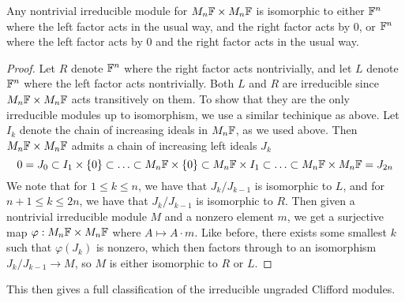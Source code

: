 %
\begin{thm}
Any nontrivial irreducible module for $M_n\mathbb{F} \times M_n\mathbb{F}$ is isomorphic to
either $\mathbb{F}^n$ where the left factor acts in the usual way, and the right factor
acts by $0$, or $\mathbb{F}^n$ where the left factor acts by $0$ and the right factor
acts in the usual way.
\end{thm}
%
\begin{proof}
Let $R$ denote $\mathbb{F}^n$ where the right factor acts nontrivially, and let $L$
denote $\mathbb{F}^n$ where the left factor acts nontrivially. Both $L$ and $R$ are
irreducible since $M_n\mathbb{F} \times M_n\mathbb{F}$ acts transitively on them. To show
that they are the only irreducible modules up to isomorphism, we use a similar
techinique as above. Let $I_k$ denote the chain of increasing ideals in $M_n\mathbb{F}$,
as we used above. Then $M_n\mathbb{F} \times M_n\mathbb{F}$ admits a chain of increasing left
ideals $J_k$
\[
0 = J_0 \subset I_1 \times \left\lbrace 0 \right\rbrace \subset \ldots \subset M_n\mathbb{F} \times \left\lbrace 0 \right\rbrace
\subset M_n\mathbb{F} \times I_1 \subset \ldots \subset M_n\mathbb{F} \times M_n\mathbb{F} = J_{2n}
\]
We note that for $1 \leq k \leq n$, we have that $J_k / J_{k-1}$ is isomorphic to
$L$, and for $n+1 \leq k \leq 2n$, we have that $J_k / J_{k-1}$ is isomorphic to
$R$. Then given a nontrivial irreducible module $M$ and a nonzero element $m$,
we get a surjective map $\varphi : M_n\mathbb{F} \times M_n\mathbb{F}$ where $A \mapsto A\cdot m$.
Like before, there exists some smallest $k$ such that $\varphi(J_k)$ is nonzero,
which then factors through to an isomorphism $J_k / J_{k-1} \to M$, so $M$
is either isomorphic to $R$ or $L$.
\end{proof}
%
This then gives a full classification of the irreducible ungraded Clifford
modules.\\

